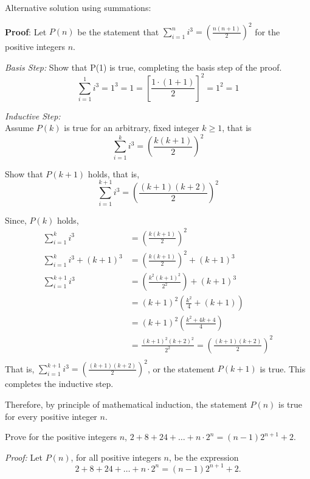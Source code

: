 \begin{questions}
\begin{solution} 
Alternative solution using summations: 

  \textbf{Proof}: Let $P(n)$ be the statement that $\sum_{i=1}^n i^3 = \left( \frac{n(n+1)}{2} \right)^2$ for the positive integers $n$.

  \textit{Basis Step:} Show that P(1) is true, completing the basis step of the proof.
        \[ \sum_{i=1}^1 i^3 = 1^3 = 1 = \left[ \frac{1 \cdot (1+1) }{2} \right]^2 = 1^2 = 1  \]

  \textit{Inductive Step:}  \\
    Assume $P(k)$ is true for an arbitrary, fixed integer $k \geq 1$, that is
        \[\sum_{i=1}^k i^3 = \left( \frac{k(k+1)}{2} \right)^2 \]

    
    Show that $P(k+1)$ holds, that is,
        \[ \sum_{i=1}^{k+1} i^3 = \left( \frac{(k+1)(k+2)}{2} \right)^2 \]
    
    Since, $P(k)$ holds,
        \begin{align*}
            \sum_{i=1}^k i^3 &= \left( \frac{k(k+1)}{2} \right)^2 \tag{Ind. Hyp.} \\
            \sum_{i=1}^k i^3 + (k+1)^3 &=  \left( \frac{k(k+1)}{2} \right)^2 + (k+1)^3   \\
            \sum_{i=1}^{k+1} i^3  &= \left(\frac{k^2(k+1)^2}{2^2} \right) + (k+1)^3 \\
              &= (k+1)^2 \left( \frac{k^2}{4} + (k + 1) \right) \\
              &= (k+1)^2 \left( \frac{k^2 + 4k + 4}{4} \right) \\
              &= \frac{(k+1)^2(k+2)^2}{2^2} =  \left( \frac{(k+1)(k+2)}{2} \right)^2\\
        \end{align*}
    That is, $\sum_{i=1}^{k+1} i^3 = \left( \frac{(k+1)(k+2)}{2} \right)^2 $, or the statement $P(k+1)$ is true.  This completes the inductive step.

    Therefore, by principle of mathematical induction, the statement $P(n)$ is true for every positive integer $n$.
\end{solution}




\newpage
{}  Prove for the positive integers $n$, $2 + 8 + 24 + \ldots + n\cdot 2^n = (n-1)2^{n+1} + 2$. 

\begin{solution}
  \textit{Proof:} Let $P(n)$, for all positive integers $n$, be the expression 
  \[ 2 + 8 + 24 + \ldots + n\cdot 2^n = (n-1)2^{n+1} + 2. \]


\end{solution}
\end{questions}
